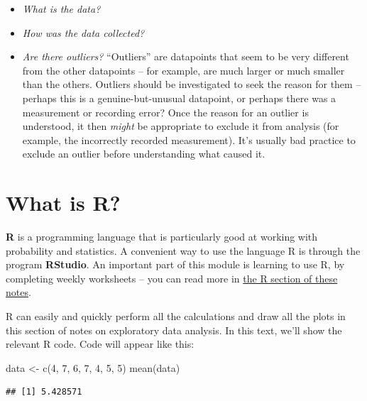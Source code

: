 \documentclass[
  a4paper,
]{book}
\newenvironment{Shaded}{\begin{snugshade}}{\end{snugshade}}
\newcommand{\DecValTok}[1]{\textcolor[rgb]{0.00,0.00,0.81}{#1}}
\newcommand{\FunctionTok}[1]{\textcolor[rgb]{0.00,0.00,0.00}{#1}}
\newcommand{\NormalTok}[1]{#1}
\newcommand{\OtherTok}[1]{\textcolor[rgb]{0.56,0.35,0.01}{#1}}
\providecommand{\tightlist}{%
  \setlength{\itemsep}{0pt}\setlength{\parskip}{0pt}}
\theoremstyle{definition}
\theoremstyle{definition}
\theoremstyle{definition}
\theoremstyle{remark}
\begin{document}
\begin{itemize}
\tightlist
\item
  \emph{What is the data?}
\item
  \emph{How was the data collected?}
\item
  \emph{Are there outliers?} ``Outliers'' are datapoints that seem to be very different from the other datapoints -- for example, are much larger or much smaller than the others. Outliers should be investigated to seek the reason for them -- perhaps this is a genuine-but-unusual datapoint, or perhaps there was a measurement or recording error? Once the reason for an outlier is understood, it then \emph{might} be appropriate to exclude it from analysis (for example, the incorrectly recorded measurement). It's usually bad practice to exclude an outlier before understanding what caused it.
\end{itemize}

\hypertarget{what-is-R}{%
\section{What is R?}\label{what-is-R}}

\textbf{R} is a programming language that is particularly good at working with probability and statistics. A convenient way to use the language R is through the program \textbf{RStudio}. An important part of this module is learning to use R, by completing weekly worksheets -- you can read more in \protect\hyperlink{R}{the R section of these notes}.

R can easily and quickly perform all the calculations and draw all the plots in this section of notes on exploratory data analysis. In this text, we'll show the relevant R code. Code will appear like this:

\begin{Shaded}
\begin{Highlighting}[]
\NormalTok{data }\OtherTok{\textless{}{-}} \FunctionTok{c}\NormalTok{(}\DecValTok{4}\NormalTok{, }\DecValTok{7}\NormalTok{, }\DecValTok{6}\NormalTok{, }\DecValTok{7}\NormalTok{, }\DecValTok{4}\NormalTok{, }\DecValTok{5}\NormalTok{, }\DecValTok{5}\NormalTok{)}
\FunctionTok{mean}\NormalTok{(data)}
\end{Highlighting}
\end{Shaded}

\begin{verbatim}
## [1] 5.428571
\end{verbatim}
\end{document}
